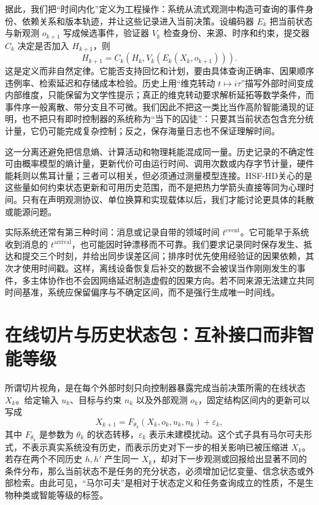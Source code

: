 据此，我们把“时间内化”定义为工程操作：系统从流式观测中构造可查询的事件身份、依赖关系和版本轨迹，并让这些记录进入当前决策。设编码器 $E_k$ 把当前状态与新观测 $o_{k+1}$ 写成候选事件，验证器 $V_k$ 检查身份、来源、时序和约束，提交器 $C_k$ 决定是否加入 $H_{k+1}$，则
\[
H_{k+1}=C_k\!\left(H_k,V_k(E_k(X_k,o_{k+1}))\right).
\]
这是定义而非自然定律。它能否支持回忆和计划，要由具体查询正确率、因果顺序违例率、检索延迟和存储成本检验。历史上用“维克转动 $t\mapsto i\tau$”描写外部时间变成内部维度，只能保留为文学性提示；真正的维克转动要求解析延拓等数学条件，而事件序一般离散、带分支且不可微。我们因此不把这一类比当作高阶智能涌现的证明，也不把只有即时控制器的系统称为“当下的囚徒”：只要其当前状态包含充分统计量，它仍可能完成复杂控制；反之，保存海量日志也不保证理解时间。

这一分离还避免把信息熵、计算活动和物理耗能混成同一量。历史记录的不确定性可由概率模型的熵计量，更新代价可由运行时间、调用次数或内存字节计量，硬件能耗则以焦耳计量；三者可以相关，但必须通过测量模型连接。HSF-HD关心的是这些量如何约束状态更新和可用历史范围，而不是把热力学箭头直接等同为心理时间。只有在声明观测协议、单位换算和实现载体以后，我们才能讨论更具体的耗散或能源问题。

实际系统还常有第三种时间：消息或记录自带的领域时间 $t^{\mathrm{event}}$。它可能早于系统收到消息的 $t^{\mathrm{arrival}}$，也可能因时钟漂移而不可靠。我们要求记录同时保存发生、抵达和提交三个时刻，并给出同步误差区间；排序时优先使用经验证的因果依赖，其次才使用时间戳。这样，离线设备恢复后补交的数据不会被误当作刚刚发生的事件，多主体协作也不会因网络延迟制造虚假的因果方向。若不同来源无法建立共同时间基准，系统应保留偏序与不确定区间，而不是强行生成唯一时间线。

\section{在线切片与历史状态包：互补接口而非智能等级}

所谓切片视角，是在每个外部时刻只向控制器暴露完成当前决策所需的在线状态 $X_k$。给定输入 $u_k$、目标与约束 $n_k$ 以及外部观测 $o_k$，固定结构区间内的更新可以写成
\[
X_{k+1}=F_{\theta_k}(X_k,o_k,u_k,n_k)+\varepsilon_k,
\]
其中 $F_{\theta_k}$ 是参数为 $\theta_k$ 的状态转移，$\varepsilon_k$ 表示未建模扰动。这个式子具有马尔可夫形式，不表示真实系统没有历史，而表示历史对下一步的相关影响已被压缩进 $X_k$。若存在两个不同历史 $h,h'$ 产生同一 $X_k$，却对下一步观测或回报给出显著不同的条件分布，那么当前状态不是任务的充分状态，必须增加记忆变量、信念状态或外部检索。由此可见，“马尔可夫”是相对于状态定义和任务查询成立的性质，不是生物种类或智能等级的标签。

